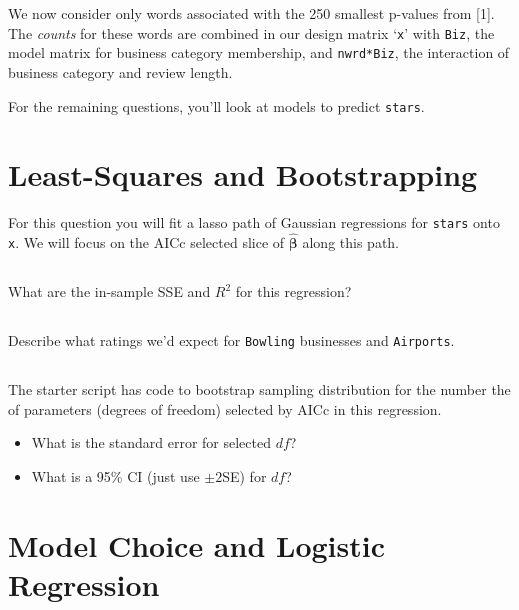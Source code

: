 \documentclass[12pt]{article}
\newcommand{\bs}[1]{\boldsymbol{#1}}
\begin{document}
\vskip 1in

\bigskip
\noindent We now consider only words associated with the 250 smallest p-values from [1].  The {\it counts} for these words are combined in our design matrix `{\tt x}' with {\tt Biz}, the model matrix for business category membership, and {\tt nwrd*Biz}, the interaction of business category and review length.  

\medskip 
\noindent For the remaining questions, you'll look at models to predict {\tt stars}.

\newpage
\section{Least-Squares and Bootstrapping}

For this question you will fit a lasso path of Gaussian regressions for {\tt stars} onto {\tt x}.  We will focus on the AICc selected slice of $\bs{\hat\beta}$ along this path. 

\subsection{} 
What are the in-sample SSE and $R^2$ for this regression?

\subsection{}
Describe what ratings we'd expect for {\tt Bowling} businesses and {\tt Airports}.

\subsection{}
The starter script has code to bootstrap sampling distribution for the number the of parameters (degrees of freedom) selected by AICc in this regression. 
\begin{itemize}
\item What is the standard error for selected $df$? 
\item What is a 95\% CI (just use $\pm 2$SE) for $df$? 
\end{itemize}




\newpage
\section{Model Choice and Logistic Regression}
\end{document}
